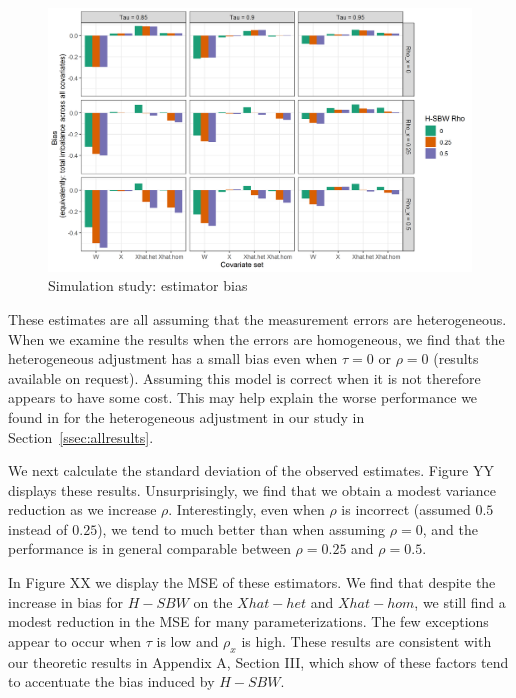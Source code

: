 \begin{figure}[H]
\begin{center}
    \caption{Simulation study: estimator bias}
    \label{fig:loveplotc1}
    \includegraphics[scale=0.5]{01_Plots/bias-plot.png}
\end{center}
\end{figure}


These estimates are all assuming that the measurement errors are heterogeneous. When we examine the results when the errors are homogeneous, we find that the heterogeneous adjustment has a small bias even when $\tau = 0$ or $\rho = 0$ (results available on request). Assuming this model is correct when it is not therefore appears to have some cost. This may help explain the worse performance we found in for the heterogeneous adjustment in our study in Section~\ref{ssec:allresults}.

We next calculate the standard deviation of the observed estimates. Figure YY displays these results. Unsurprisingly, we find that we obtain a modest variance reduction as we increase $\rho$. Interestingly, even when $\rho$ is incorrect (assumed $0.5$ instead of $0.25$), we tend to much better than when assuming $\rho = 0$, and the performance is in general comparable between $\rho = 0.25$ and $\rho = 0.5$.

In Figure XX we display the MSE of these estimators. We find that despite the increase in bias for $H-SBW$ on the $Xhat-het$ and $Xhat-hom$, we still find a modest reduction in the MSE for many parameterizations. The few exceptions appear to occur when $\tau$ is low and $\rho_x$ is high. These results are consistent with our theoretic results in Appendix A, Section III, which show of these factors tend to accentuate the bias induced by $H-SBW$.

